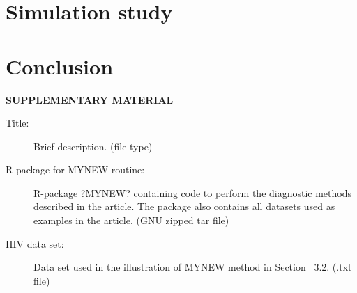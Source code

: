 \documentclass[12pt]{article}\usepackage[]{graphicx}\usepackage[]{color}
\begin{document}
\section{Simulation study}
\label{sec:verify}

\section{Conclusion}
\label{sec:conc}


\newpage
\begin{center}
{\large\bf SUPPLEMENTARY MATERIAL}
\end{center}

\begin{description}

\item[Title:] Brief description. (file type)

\item[R-package for  MYNEW routine:] R-package ?MYNEW? containing code to perform the diagnostic methods described in the article. The package also contains all datasets used as examples in the article. (GNU zipped tar file)

\item[HIV data set:] Data set used in the illustration of MYNEW method in Section~ 3.2. (.txt file)

\end{description}



\end{document}
